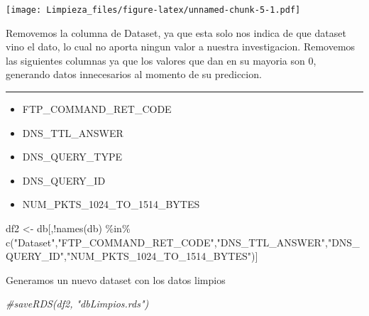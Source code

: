 \documentclass[
]{article}
\newenvironment{Shaded}{\begin{snugshade}}{\end{snugshade}}
\newcommand{\CommentTok}[1]{\textcolor[rgb]{0.56,0.35,0.01}{\textit{#1}}}
\newcommand{\FunctionTok}[1]{\textcolor[rgb]{0.00,0.00,0.00}{#1}}
\newcommand{\NormalTok}[1]{#1}
\newcommand{\OtherTok}[1]{\textcolor[rgb]{0.56,0.35,0.01}{#1}}
\newcommand{\SpecialCharTok}[1]{\textcolor[rgb]{0.00,0.00,0.00}{#1}}
\newcommand{\StringTok}[1]{\textcolor[rgb]{0.31,0.60,0.02}{#1}}
\providecommand{\tightlist}{%
  \setlength{\itemsep}{0pt}\setlength{\parskip}{0pt}}
\begin{document}
\texttt{[image: Limpieza\_files/figure-latex/unnamed-chunk-5-1.pdf]}

Removemos la columna de Dataset, ya que esta solo nos indica de que
dataset vino el dato, lo cual no aporta ningun valor a nuestra
investigacion. Removemos las siguientes columnas ya que los valores que
dan en su mayoria son 0, generando datos innecesarios al momento de su
prediccion.

\begin{center}\rule{0.5\linewidth}{0.5pt}\end{center}

\begin{itemize}
\tightlist
\item
  FTP\_COMMAND\_RET\_CODE
\item
  DNS\_TTL\_ANSWER
\item
  DNS\_QUERY\_TYPE
\item
  DNS\_QUERY\_ID
\item
  NUM\_PKTS\_1024\_TO\_1514\_BYTES
\end{itemize}

\begin{Shaded}
\begin{Highlighting}[]
\NormalTok{df2 }\OtherTok{\textless{}{-}}\NormalTok{ db[,}\SpecialCharTok{!}\FunctionTok{names}\NormalTok{(db) }\SpecialCharTok{\%in\%} \FunctionTok{c}\NormalTok{(}\StringTok{"Dataset"}\NormalTok{,}\StringTok{"FTP\_COMMAND\_RET\_CODE"}\NormalTok{,}\StringTok{"DNS\_TTL\_ANSWER"}\NormalTok{,}\StringTok{"DNS\_QUERY\_ID"}\NormalTok{,}\StringTok{"NUM\_PKTS\_1024\_TO\_1514\_BYTES"}\NormalTok{)]}
\end{Highlighting}
\end{Shaded}

Generamos un nuevo dataset con los datos limpios

\begin{Shaded}
\begin{Highlighting}[]
\CommentTok{\#saveRDS(df2, "dbLimpios.rds")}
\end{Highlighting}
\end{Shaded}
\end{document}
